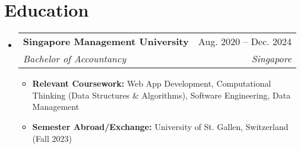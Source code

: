 \documentclass[letterpaper,11pt]{article}
\makeatletter
\newcommand{\resumeItem}[1]{
  \item\small{
    {#1 \vspace{-2pt}}
  }
}
\newcommand{\resumeSubheading}[4]{
  \vspace{-2pt}\item
    \begin{tabular*}{0.97\textwidth}[t]{l@{\extracolsep{\fill}}r}
      \textbf{#1} & #2 \\
      \textit{\small#3} & \textit{\small #4} \\
    \end{tabular*}\vspace{-7pt}
}
\newcommand{\resumeSubHeadingListStart}{\begin{itemize}[leftmargin=0.15in, label={}]}
\newcommand{\resumeSubHeadingListEnd}{\end{itemize}}
\newcommand{\resumeItemListStart}{\begin{itemize}}
\newcommand{\resumeItemListEnd}{\end{itemize}\vspace{-5pt}}
\makeatother
\begin{document}
\section{Education}
  \resumeSubHeadingListStart
    \resumeSubheading
      {Singapore Management University}{Aug. 2020 -- Dec. 2024}
      {Bachelor of Accountancy}{Singapore}
      \resumeItemListStart
        \resumeItem{\textbf {Relevant Coursework:} Web App Development, Computational Thinking (Data Structures \& Algorithms), Software Engineering, Data Management}
        \resumeItem{\textbf {Semester Abroad/Exchange:} University of St. Gallen, Switzerland (Fall 2023)}
      \resumeItemListEnd
  \resumeSubHeadingListEnd


\end{document}
